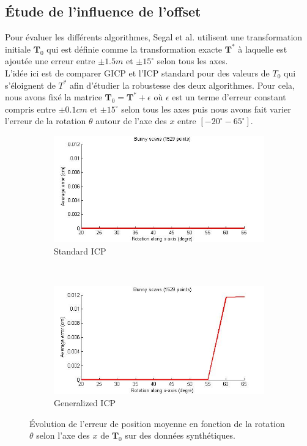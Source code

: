 \subsection{Étude de l'influence de l'offset}

Pour évaluer les différents algorithmes, Segal et al. utilisent une transformation initiale $\mathbf{T}_0$ qui est définie comme la transformation exacte $\mathbf{T}^*$ à laquelle est ajoutée une erreur entre $\pm1.5m$ et $\pm15^{\circ}$ selon tous les axes. \\

L'idée ici est de comparer GICP et l'ICP standard pour des valeurs de $T_0$ qui s'éloignent de $T^*$ afin d'étudier la robustesse des deux algorithmes. Pour cela, nous avons fixé la matrice $\mathbf{T}_0=\mathbf{T}^*+\epsilon $ où $\epsilon$ est un terme d'erreur constant compris entre $\pm0.1cm$ et $\pm15^{\circ}$ selon tous les axes puis nous avons fait varier l'erreur de la rotation $\theta$ autour de l'axe des $x$ entre $[-20^{\circ} -65^{\circ}]$.\\

\begin{figure}[!h]
   \centering
   \begin{subfigure}[t]{.5\linewidth}
     \centering
     \includegraphics[scale=0.4]{Images/Resultats/bunny_offset_evol-error_sicp.jpg}
     \caption{Standard ICP}
   \end{subfigure}%
   ~
   \begin{subfigure}[t]{.5\linewidth}
     \centering
     \includegraphics[scale=0.4]{Images/Resultats/bunny_offset_evol-error_gicp.jpg}
     \caption{Generalized ICP}
   \end{subfigure}
   
   \caption{Évolution de l'erreur de position moyenne en fonction de la rotation $\theta$ selon l'axe des $x$ de $\mathbf{T}_0$ sur des données synthétiques.}
   \label{fig:offset}
\end{figure}



